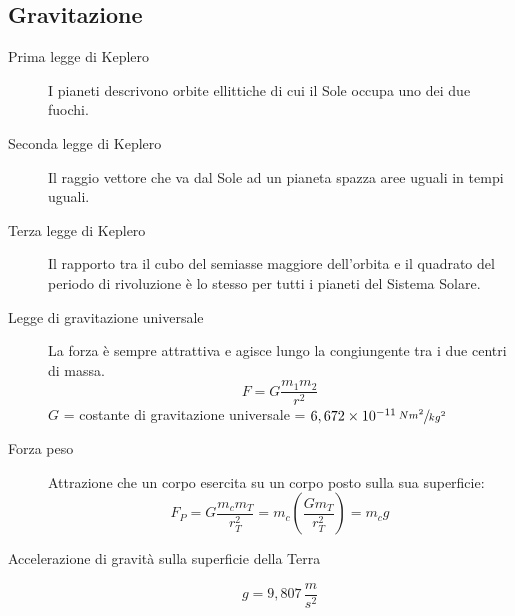\documentclass[a4paper,11pt,italian]{article}
\begin{document}
\subsection{Gravitazione}

\begin{description}
  \item[Prima legge di Keplero]  
  I pianeti descrivono orbite ellittiche di cui il Sole occupa uno dei due fuochi.
  
  \item[Seconda legge di Keplero] 
  Il raggio vettore che va dal Sole ad un pianeta spazza aree uguali in tempi uguali.
  
  \item[Terza legge di Keplero] 
  Il rapporto tra il cubo del semiasse maggiore dell'orbita e il quadrato del periodo di rivoluzione è lo stesso per tutti i pianeti del Sistema Solare.
  
  \item[Legge di gravitazione universale] 
  La forza è sempre attrattiva e agisce lungo la congiungente tra i due centri di massa. 
  \[ F = G \frac{m_1 m_2}{r^2} \]
  $ G $ = costante di gravitazione universale = $ 6,672 \times 10^{-11} \, \sfrac{Nm^2}{kg^2} $
  
  \item[Forza peso] 
  Attrazione che un corpo esercita su un corpo posto sulla sua superficie: 
  \[ F_P = G \frac{m_{c} m_{T}}{r^2_{T}} =  m_{c} \left(\frac{G m_{T}}{r^2_{T}} \right) = m_{c} g \]
  
  \item[Accelerazione di gravità sulla superficie della Terra] 
  \[ g =  9, 807 \, \frac{m}{s^2} \]

\end{description}
\end{document}
